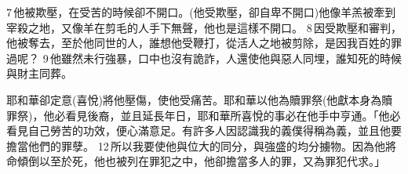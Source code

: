 7 他被欺壓，在受苦的時候卻不開口。(他受欺壓，卻自卑不開口)他像羊羔被牽到宰殺之地，又像羊在剪毛的人手下無聲，他也是這樣不開口。 8 因受欺壓和審判，他被奪去，至於他同世的人，誰想他受鞭打，從活人之地被剪除，是因我百姓的罪過呢？ 9 他雖然未行強暴，口中也沒有詭詐，人還使他與惡人同埋，誰知死的時候與財主同葬。

耶和華卻定意(喜悅)將他壓傷，使他受痛苦。耶和華以他為贖罪祭(他獻本身為贖罪祭)，他必看見後裔，並且延長年日，耶和華所喜悅的事必在他手中亨通。「他必看見自己勞苦的功效，便心滿意足。有許多人因認識我的義僕得稱為義，並且他要擔當他們的罪孽。 12 所以我要使他與位大的同分，與強盛的均分擄物。因為他將命傾倒以至於死，他也被列在罪犯之中，他卻擔當多人的罪，又為罪犯代求。」


